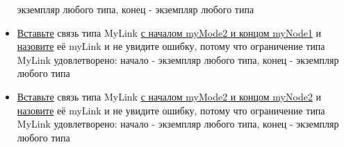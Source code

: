 \begin{itemize}
            экземпляр
            любого типа, конец - экземпляр любого типа
      \item \hyperlink{DeepCase.InsertLink.Description}{Вставьте} связь типа
            MyLink
            \hyperlink{FAQ.HowToInsertLinkWithFromAndTo}{с началом myMode2 и
                  концом
                  myNode1} и \hyperlink{FAQ.HowToSetName}{назовите} её myLink и
            не
            увидите
            ошибку, потому что ограничение типа MyLink удовлетворено: начало -
            экземпляр
            любого типа, конец - экземпляр любого типа
      \item \hyperlink{DeepCase.InsertLink.Description}{Вставьте} связь типа
            MyLink
            \hyperlink{FAQ.HowToInsertLinkWithFromAndTo}{с началом myMode2 и
                  концом
                  myNode2} и \hyperlink{FAQ.HowToSetName}{назовите} её myLink и
            не
            увидите
            ошибку, потому что ограничение типа MyLink удовлетворено: начало -
            экземпляр
            любого типа, конец - экземпляр любого типа
\end{itemize}
